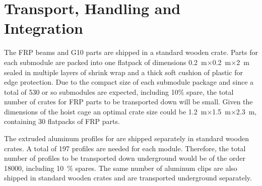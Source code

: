 \section{Transport, Handling and Integration}
\label{sec:fddp-hv-install-transport}


The  FRP beams and G10 parts are shipped in a standard wooden crate.  Parts for each submodule are packed into one %
flatpack of dimensions \SI{0.2}{m}$\times$\SI{0.2}{m}$\times$\SI{2}{m} sealed in multiple layers of shrink wrap and a thick soft cushion of plastic for edge protection.   Due to the compact size of each submodule package and since a total of 530 or so submodules are expected, including 10\% spare, the total number of crates for FRP parts to be transported down will be small. Given the dimensions of the hoist cage an optimal crate size could be \SI{1.2}{m}$\times$\SI{1.5}{m}$\times$\SI{2.3}{m}, containing 30 flatpacks of FRP parts.


The extruded aluminum profiles for  are shipped separately in  standard wooden crates.  A total of \num{197} profiles are needed for each \tpcheight module. Therefore, the total number of profiles to be transported down underground would be of the order \num{18000}, including \SI{10}{\%} spares.  The same number of aluminum clips are also shipped in standard wooden crates and are transported underground separately. 


